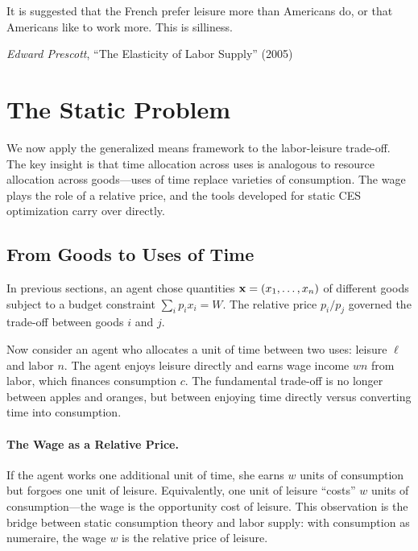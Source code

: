 \epigraph{It is suggested that the French prefer leisure more than Americans do, or that Americans like to work more. This is silliness.}{\textit{Edward Prescott}, ``The Elasticity of Labor Supply'' (2005)}

\section{The Static Problem}
\label{sec:labor-static}

We now apply the generalized means framework to the labor-leisure trade-off. The key insight is that time allocation across uses is analogous to resource allocation across goods---uses of time replace varieties of consumption. The wage plays the role of a relative price, and the tools developed for static CES optimization carry over directly.

\subsection{From Goods to Uses of Time}
\label{subsec:goods-to-time}

In previous sections, an agent chose quantities $\mathbf{x} = (x_1, \ldots, x_n)$ of different goods subject to a budget constraint $\sum_i p_i x_i = W$. The relative price $p_i/p_j$ governed the trade-off between goods $i$ and $j$.

Now consider an agent who allocates a unit of time between two uses: leisure $\ell$ and labor $n$. The agent enjoys leisure directly and earns wage income $wn$ from labor, which finances consumption $c$. The fundamental trade-off is no longer between apples and oranges, but between enjoying time directly versus converting time into consumption.

\paragraph{The Wage as a Relative Price.}
If the agent works one additional unit of time, she earns $w$ units of consumption but forgoes one unit of leisure. Equivalently, one unit of leisure ``costs'' $w$ units of consumption---the wage is the opportunity cost of leisure. This observation is the bridge between static consumption theory and labor supply: with consumption as numeraire, the wage $w$ is the relative price of leisure.

